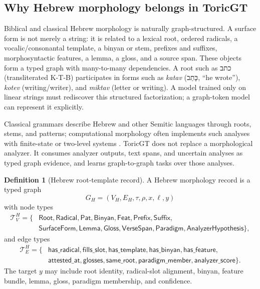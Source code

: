 \documentclass[11pt]{article}
\newcommand{\heb}[1]{\textsf{#1}}
\newcommand{\heb}[1]{{\hebrewfont #1}}
\theoremstyle{definition}
\newtheorem{definition}{Definition}[section]
\theoremstyle{plain}
\theoremstyle{remark}
\numberwithin{equation}{section}
\newcommand{\Root}{\mathsf{Root}}
\newcommand{\Pat}{\mathsf{Pat}}
\newcommand{\Binyan}{\mathsf{Binyan}}
\newcommand{\Feat}{\mathsf{Feat}}
\begin{document}
\subsection{Why Hebrew morphology belongs in ToricGT}

Biblical and classical Hebrew morphology is naturally graph-structured.  A surface form is not merely a string: it is related to a lexical root, ordered radicals, a vocalic/consonantal template, a binyan or stem, prefixes and suffixes, morphosyntactic features, a lemma, a gloss, and a source span.  These objects form a typed graph with many-to-many dependencies.  A root such as \heb{כתב} (transliterated K-T-B) participates in forms such as \emph{katav} (\heb{כָּתַב}, ``he wrote''), \emph{kotev} (writing/writer), and \emph{miktav} (letter or writing).  A model trained only on linear strings must rediscover this structured factorization; a graph-token model can represent it explicitly.

Classical grammars describe Hebrew and other Semitic languages through roots, stems, and patterns; computational morphology often implements such analyses with finite-state or two-level systems \cite{gesenius1910,waltke1990,joüon2006,koskenniemi1983,beesley2003,yona2008}.  ToricGT does not replace a morphological analyzer.  It consumes analyzer outputs, text spans, and uncertain analyses as typed graph evidence, and learns graph-to-graph tasks over those analyses.

\begin{definition}[Hebrew root-template record]
A Hebrew morphology record is a typed graph
\begin{equation}
  G_H=(V_H,E_H,\tau,\rho,x,\ell,y)
\end{equation}
with node types
\begin{equation}
\begin{split}
  \mathcal T_V^H=\{&\Root,\mathsf{Radical},\Pat,\Binyan,\Feat,\mathsf{Prefix},\mathsf{Suffix},\\
  &\mathsf{SurfaceForm},\mathsf{Lemma},\mathsf{Gloss},\mathsf{VerseSpan},\mathsf{Paradigm},\mathsf{AnalyzerHypothesis}\},
\end{split}
\end{equation}
and edge types
\begin{equation}
\begin{split}
  \mathcal T_E^H=\{&\mathsf{has\_radical},\mathsf{fills\_slot},\mathsf{has\_template},\mathsf{has\_binyan},\mathsf{has\_feature},\\
  &\mathsf{attested\_at},\mathsf{glosses},\mathsf{same\_root},\mathsf{paradigm\_member},\mathsf{analyzer\_score}\}.
\end{split}
\end{equation}
The target $y$ may include root identity, radical-slot alignment, binyan, feature bundle, lemma, gloss, paradigm membership, and confidence.
\end{definition}
\end{document}

